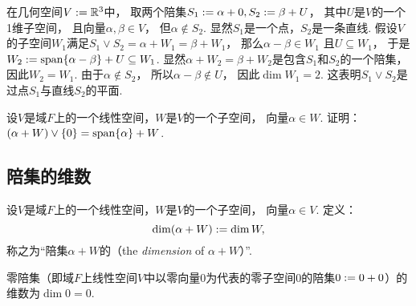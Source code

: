 \begin{example}
在几何空间\(V := \mathbb{R}^3\)中，
取两个陪集\(
	S_1 := \alpha + 0,
	S_2 := \beta + U
\)，
其中\(U\)是\(V\)的一个1维子空间，
且向量\(\alpha,\beta \in V\)，
但\(\alpha \notin S_2\).
显然\(S_1\)是一个点，\(S_2\)是一条直线.
假设\(V\)的子空间\(W_1\)满足\(
	S_1 \vee S_2
	= \alpha + W_1
	= \beta + W_1
\)，
那么\(\alpha - \beta \in W_1\)
且\(U \subseteq W_1\)，
于是\(
	W_2
	\allowbreak
	:= \operatorname{span}\{\alpha - \beta\} + U
	\allowbreak
	\subseteq W_1
\).
显然\(\alpha + W_2 = \beta + W_2\)是包含\(S_1\)和\(S_2\)的一个陪集，
因此\(W_2 = W_1\).
由于\(\alpha \notin S_2\)，
所以\(\alpha - \beta \notin U\)，
因此\(\dim W_1 = 2\).
这表明\(S_1 \vee S_2\)是过点\(S_1\)与直线\(S_2\)的平面.
\end{example}

\begin{example}
设\(V\)是域\(F\)上的一个线性空间，\(W\)是\(V\)的一个子空间，
向量\(\alpha \in W\).
证明：\((\alpha + W) \vee \{0\} = \operatorname{span}\{\alpha\} + W\).
\end{example}

\subsection{陪集的维数}
\begin{definition}
设\(V\)是域\(F\)上的一个线性空间，\(W\)是\(V\)的一个子空间，
向量\(\alpha \in V\).
定义：\begin{equation}
	\dim(\alpha + W)
	:=
	\dim W,
\end{equation}
称之为“陪集\(\alpha + W\)的（the \emph{dimension} of \(\alpha + W\)）”.
\end{definition}

\begin{example}
零陪集（即域\(F\)上线性空间\(V\)中以零向量\(0\)为代表的零子空间\(0\)的陪集\(0 := 0+0\)）的
维数为\(\dim 0 = 0\).
\end{example}

